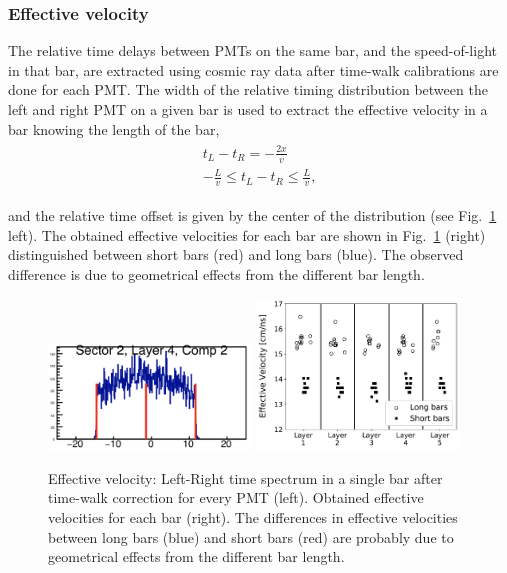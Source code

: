 \documentclass[3p,final,twocolumn]{elsarticle}
\begin{document}
{\subsubsection{Effective velocity}
The relative time delays between PMTs on the same bar, and the speed-of-light in that bar, are extracted using cosmic ray 
data after time-walk calibrations are done for each PMT. The width of the relative timing distribution between the left and 
right PMT on a given bar is used to extract the effective velocity in a bar knowing the length of the bar,
\begin{eqnarray}
	\begin{split}
		t_L - t_R 	= -\frac{2x}{v}							\\
		 -\frac{L}{v}	\leq 	t_L - t_R 	\leq \frac{L}{v},				
		 \label{eqn:eff_vel}
	\end{split}
\end{eqnarray}

and the relative time offset is given by the center of the distribution (see Fig.~\ref{fig:eff_vel} left). The obtained effective velocities for each bar are shown in Fig.~\ref{fig:eff_vel} (right) distinguished between short bars (red) and long bars (blue). The observed difference is due to geometrical effects from the different bar length.

\begin{figure}[h!]
	\centering
		\includegraphics[width=0.48\textwidth]{lr_eff_vel.png}
		\includegraphics[width=0.48\textwidth]{eff_vel.pdf}
	\caption{Effective velocity: Left-Right time spectrum in a single bar after time-walk correction for every PMT (left). Obtained effective velocities for each bar (right). The differences in effective velocities between long bars (blue) and short bars (red) are probably due to geometrical effects from the different bar length.}
	\label{fig:eff_vel}
\end{figure}

}
\end{document}
